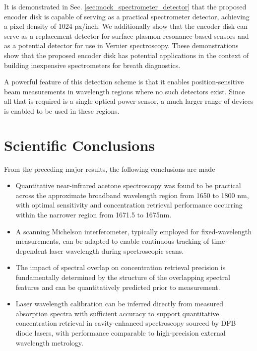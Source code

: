 \documentclass[12pt]{report}
\begin{document}
	It is demonstrated in Sec. \ref{sec:mock_spectrometer_detector} that the proposed encoder disk is capable of serving as a practical spectrometer detector, achieving a pixel density of 1024 px/inch. We additionally show that the encoder disk can serve as a replacement detector for surface plasmon resonance-based sensors and as a potential detector for use in Vernier spectroscopy. These demonstrations show that the proposed encoder disk has potential applications in the context of building inexpensive spectrometers for breath diagnostics.
	
	A powerful feature of this detection scheme is that it enables position-sensitive beam measurements in wavelength regions where no such detectors exist. Since all that is required is a single optical power sensor, a much larger range of devices is enabled to be used in these regions.
	
	\section{Scientific Conclusions}
	From the preceding major results, the following conclusions are made
	\begin{itemize}
		\item Quantitative near-infrared acetone spectroscopy was found to be practical across the approximate broadband wavelength region from 1650 to 1800 nm, with optimal sensitivity and concentration retrieval performance occurring within the narrower region from 1671.5 to 1675nm.
		
		\item A scanning Michelson interferometer, typically employed for fixed-wavelength measurements, can be adapted to enable continuous tracking of time-dependent laser wavelength during spectroscopic scans.
		
		\item The impact of spectral overlap on concentration retrieval precision is fundamentally determined by the structure of the overlapping spectral features and can be quantitatively predicted prior to measurement.
		
		\item Laser wavelength calibration can be inferred directly from measured absorption spectra with sufficient accuracy to support quantitative concentration retrieval in cavity-enhanced spectroscopy sourced by DFB diode lasers, with performance comparable to high-precision external wavelength metrology.
	\end{itemize}
	
\end{document}

